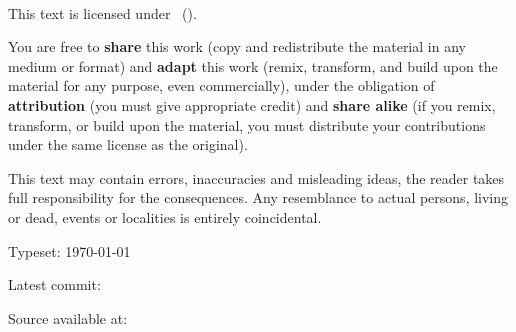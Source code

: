 
{\small
\setlength{\parindent}{0em}\setlength{\parskip}{1em}

~

\vfill


\doclicenseIcon
This text is licensed under 
\doclicenseLongNameRef \ 
(\doclicenseNameRef).

You are free to 
\textbf{share} this work (copy and redistribute the material in any medium or format) 
and 
\textbf{adapt} this work (remix, transform, and build upon the material for any purpose, even commercially),
under the obligation of 
\textbf{attribution} (you must give appropriate credit)
and
\textbf{share alike} (if you remix, transform, or build upon the material, you must distribute your contributions under the same license as the original). 

This text may contain errors, inaccuracies and misleading ideas, the reader takes full responsibility for the consequences. 
Any resemblance to actual persons, living or dead, events or localities is entirely coincidental.

Typeset: \today

Latest commit: \commiturl

Source available at: \sourcelink
}
